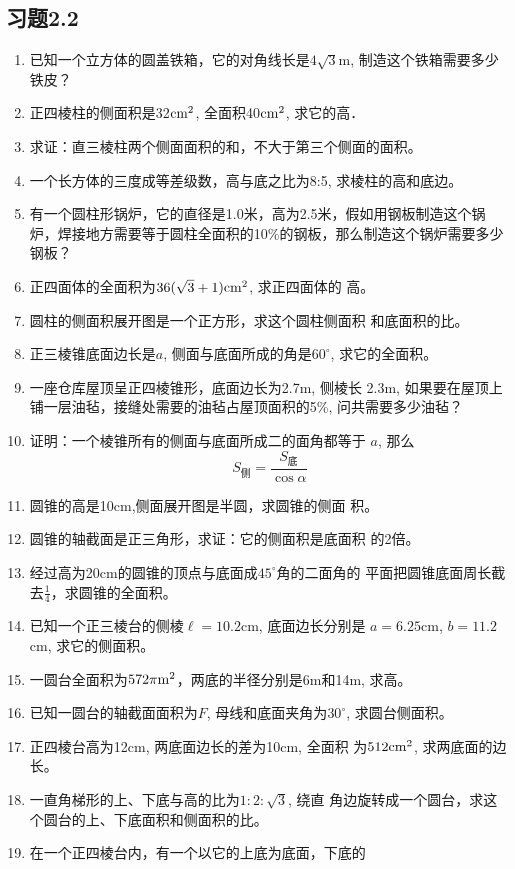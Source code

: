 \subsection*{习题2.2}
\begin{enumerate}
\item 已知一个立方体的圆盖铁箱，它的对角线长是$4\sqrt{3}$m, 制造这个铁箱需要多少铁皮？
\item 正四棱柱的侧面积是32${\rm cm^2}$, 全面积40${\rm cm^2}$, 求它的高．    
\item 求证：直三棱柱两个侧面面积的和，不大于第三个侧面的面积。
\item 一个长方体的三度成等差级数，高与底之比为8:5, 
求棱柱的高和底边。
\item 有一个圆柱形锅炉，它的直径是1.0米，高为2.5米，假如用钢板制造这个锅炉，焊接地方需要等于圆柱全面积的10\%的钢板，那么制造这个锅炉需要多少钢板？
\item 正四面体的全面积为$36(\sqrt{3}+1){\rm cm^2}$, 求正四面体的
高。
\item 圆柱的侧面积展开图是一个正方形，求这个圆柱侧面积
和底面积的比。
\item 正三棱锥底面边长是$a$, 侧面与底面所成的角是$60^{\circ}$, 
求它的全面积。
\item 一座仓库屋顶呈正四棱锥形，底面边长为2.7m, 侧棱长
2.3m, 如果要在屋顶上铺一层油毡，接缝处需要的油毡占屋顶面积的5\%, 问共需要多少油毡？
\item 证明：一个棱锥所有的侧面与底面所成二的面角都等于
$a$, 那么
\[S_{\text{侧}}=\frac{S_{\text{底}}}{\cos\alpha}\]
\item 圆锥的高是10cm,侧面展开图是半圆，求圆锥的侧面
积。
\item 圆锥的轴截面是正三角形，求证：它的侧面积是底面积
的2倍。
\item 经过高为20cm的圆锥的顶点与底面成$45^{\circ}$角的二面角的
平面把圆锥底面周长截去$\frac{1}{4}$，求圆锥的全面积。
\item 已知一个正三棱台的侧棱$\ell=10.2$cm, 底面边长分别是
$a=6.25$cm, $b=11.2$cm, 求它的侧面积。
\item 一圆台全面积为$572\pi {\rm m^2}$，两底的半径分别是6m和14m, 
求高。
\item 已知一圆台的轴截面面积为$F$, 母线和底面夹角为$30^{\circ}$, 
求圆台侧面积。
\item 正四棱台高为12cm, 两底面边长的差为10cm, 全面积
为$512{\rm cm^2}$, 求两底面的边长。
\item 一直角梯形的上、下底与高的比为$1:2:\sqrt{3}$, 绕直
角边旋转成一个圆台，求这个圆台的上、下底面积和侧面积的比。
\item 在一个正四棱台内，有一个以它的上底为底面，下底的

\end{enumerate}

